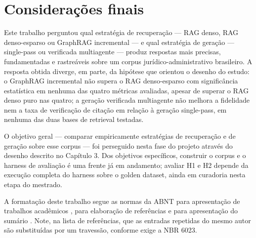 
\section{Considerações finais}

Este trabalho perguntou qual estratégia de recuperação --- RAG denso, RAG
denso-esparso ou GraphRAG incremental --- e qual estratégia de geração ---
single-pass ou verificada multiagente --- produz respostas mais precisas,
fundamentadas e rastreáveis sobre um corpus jurídico-administrativo
brasileiro. A resposta obtida diverge, em parte, da hipótese que orientou o
desenho do estudo: o GraphRAG incremental não supera o RAG denso-esparso com
significância estatística em nenhuma das quatro métricas avaliadas, apesar
de superar o RAG denso puro nas quatro; a geração verificada multiagente não
melhora a fidelidade nem a taxa de verificação de citação em relação à
geração single-pass, em nenhuma das duas bases de retrieval testadas.

O objetivo geral --- comparar empiricamente estratégias de recuperação e de
geração sobre esse corpus --- foi perseguido nesta fase do projeto através
do desenho descrito no Capítulo 3. Dos objetivos específicos, construir o
corpus e o harness de avaliação é uma frente já em andamento; avaliar H1 e
H2 depende da execução completa do harness sobre o golden dataset, ainda em
curadoria nesta etapa do mestrado.

A formatação deste trabalho segue as normas da ABNT para apresentação de
trabalhos acadêmicos \parencite{abnt14724}, para elaboração de referências
\parencite{abnt6023} e para apresentação do sumário \parencite{abnt6027}. Note,
na lista de referências, que as entradas repetidas do mesmo autor são
substituídas por um travessão, conforme exige a NBR 6023.
